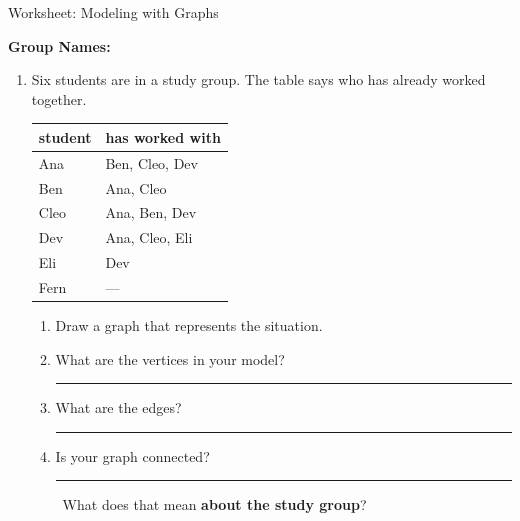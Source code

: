 \documentclass[12pt]{article}
\newcommand{\ans}[1][1in]{\rule{#1}{.5pt}}
\renewcommand{\emph}[1]{\textsf{\textbf{#1}}}
\begin{document}
\begin{center}
{\Large  Worksheet:  Modeling with Graphs	}
\end{center}


\noindent \textbf{Group Names:} \hrulefill 

\begin{enumerate}

\item  Six students are in a study group. The table says who has already worked together.

\begin{center}
\begin{tabular}{l|l}
student & has worked with \\ \hline
Ana & Ben, Cleo, Dev \\
Ben & Ana, Cleo \\
Cleo & Ana, Ben, Dev \\
Dev & Ana, Cleo, Eli \\
Eli & Dev \\
Fern & --- \\
\end{tabular}
\end{center}

\begin{enumerate}
\item Draw a graph that represents the situation.

\vspace{2in}


\item What are the vertices in your model? \ans[3.2in]

\item What are the edges? \ans[3.2in]

\item Is your graph connected? \ans[.7in] \ What does that mean \emph{about the study group}?

\vspace{.6in}


\end{enumerate}
\end{enumerate}
\end{document}
